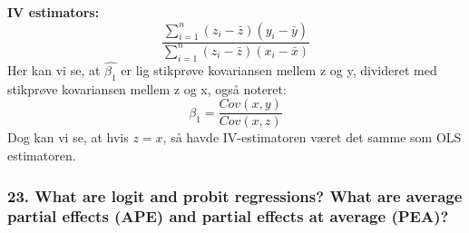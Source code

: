 \documentclass[
  10pt,
]{article}
\begin{document}
\textbf{IV estimators:}\\
\[ \frac{\sum\limits_{i=1}^n (z_i-\bar{z})(y_i-\bar{y})}{\sum\limits_{i=1}^n (z_i-\bar{z})(x_i-\bar{x})} \]
Her kan vi se, at \(\hat{\beta_1}\) er lig stikprøve kovariansen mellem
z og y, divideret med stikprøve kovariansen mellem z og x, også noteret:
\[ \beta_1=\frac{Cov(x,y)}{Cov(x,z)}\] Dog kan vi se, at hvis \(z=x\),
så havde IV-estimatoren været det samme som OLS estimatoren.

\hypertarget{what-are-logit-and-probit-regressions-what-are-average-partial-effects-ape-and-partial-effects-at-average-pea}{%
\subsubsection{23. What are logit and probit regressions? What are
average partial effects (APE) and partial effects at average
(PEA)?}\label{what-are-logit-and-probit-regressions-what-are-average-partial-effects-ape-and-partial-effects-at-average-pea}}
\end{document}
